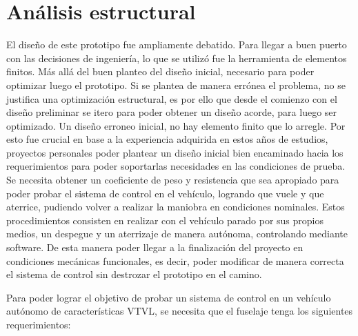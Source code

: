 \section{Análisis estructural}\label{sec:fea}

El diseño de este prototipo fue ampliamente debatido. Para llegar a buen puerto con las decisiones de ingeniería, lo que se utilizó fue la herramienta de elementos finitos. Más allá del buen planteo del diseño inicial, necesario para poder optimizar luego el prototipo. Si se plantea de manera errónea el problema, no se justifica una optimización estructural, es por ello que desde el comienzo con el diseño preliminar se itero para poder obtener un diseño acorde, para luego ser optimizado. Un diseño erroneo inicial, no hay elemento finito que lo arregle. Por esto fue crucial en base a la experiencia adquirida en estos años de estudios, proyectos personales poder
plantear un diseño inicial bien encaminado hacia los requerimientos para poder soportarlas necesidades en las condiciones de prueba. Se necesita obtener un coeficiente de peso y resistencia que sea apropiado para poder probar el sistema de control en el vehículo, logrando que vuele y que aterrice, pudiendo volver a realizar la maniobra en condiciones nominales. Estos procedimientos consisten en realizar con el vehículo parado por sus propios medios, un despegue y un aterrizaje de manera autónoma, controlando mediante software. De esta manera poder llegar a la finalización del proyecto en condiciones mecánicas funcionales, es decir, poder modificar de manera correcta el sistema de control sin destrozar el prototipo en el camino. 

\medskip

Para poder lograr el objetivo de probar un sistema de control en un vehículo autónomo de características VTVL, se necesita que el fuselaje tenga los siguientes requerimientos:


